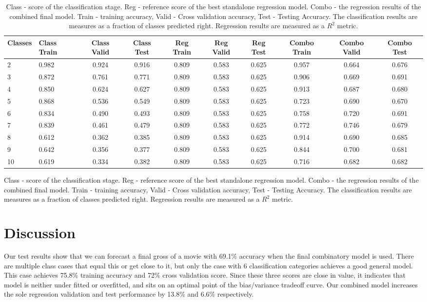 \begin{table}[!h]
\caption{Class - score of the classification stage. Reg - reference score of the best standalone regression model. Combo - the regression results of the combined final model. Train - training accuracy, Valid - Cross validation accuracy, Test - Testing Accuracy. The classification results are measures as a fraction of classes predicted right. Regression results are measured as a $R^2$ metric.}
\label{tab:top_ten_methods}
\centering
\begin{tabular}{|p{1cm}|p{1cm}|c|c|c|c|c|c|c|c|}
\hline
Classes&Class Train&Class Valid&Class Test&Reg Train&Reg Valid&Reg Test&Combo Train&Combo Valid&Combo Test \\
\hline
2 & 0.982 & 0.924 & 0.916 & 0.809 & 0.583 & 0.625 & 0.957 & 0.664 & 0.676 \\
3 & 0.872 & 0.761 & 0.771 & 0.809 & 0.583 & 0.625 & 0.906 & 0.669 & 0.691 \\ 
4 & 0.850 & 0.624 & 0.627 & 0.809 & 0.583 & 0.625 & 0.913 & 0.687 & 0.680 \\
5 & 0.868 & 0.536 & 0.549 & 0.809 & 0.583 & 0.625 & 0.723 & 0.690 & 0.670 \\
6 & 0.834 & 0.490 & 0.493 & 0.809 & 0.583 & 0.625 & 0.758 & 0.720 & 0.691 \\
7 & 0.839 & 0.461 & 0.479 & 0.809 & 0.583 & 0.625 & 0.772 & 0.746 & 0.679 \\
8 & 0.612 & 0.362 & 0.385 & 0.809 & 0.583 & 0.625 & 0.914 & 0.690 & 0.685 \\
9 & 0.642 & 0.356 & 0.377 & 0.809 & 0.583 & 0.625 & 0.844 & 0.700 & 0.681 \\
10 & 0.619 & 0.334 & 0.382 & 0.809 & 0.583 & 0.625 & 0.716 & 0.682 & 0.682 \\
\hline

\end{tabular}
\end{table}

Class - score of the classification stage. Reg - reference score of the best standalone regression model. Combo - the regression results of the combined final model. Train - training accuracy, Valid - Cross validation accuracy, Test - Testing Accuracy. The classification results are measures as a fraction of classes predicted right. Regression results are measured as a $R^2$ metric. 

\section{Discussion}
Our test results show that we can forecast a final gross of a movie with 69.1\% accuracy when the final combinatory model is used. There are multiple class cases that equal this or get close to it, but only the case with 6 classification categories achieves a good general model. This case achieves 75.8\% training accuracy and 72\% cross validation score. Since these three scores are close in value, it indicates that model is neither under fitted or overfitted, and sits on an optimal point of the bias/variance tradeoff curve. Our combined model increases the sole regression validation and test performance by 13.8\%  and 6.6\% respectively. 

